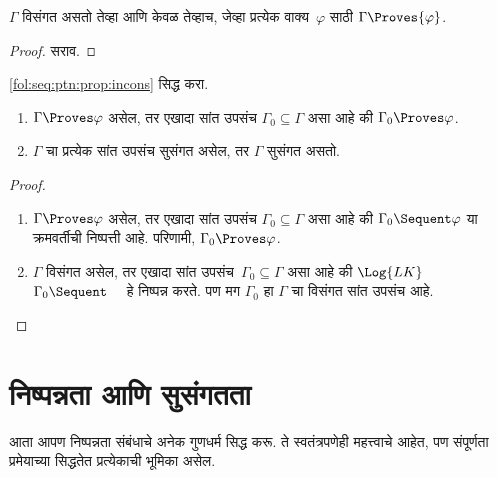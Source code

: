 \begin{prop}
\label{fol:seq:ptn:prop:incons}
$\Gamma$ विसंगत असतो तेव्हा आणि केवळ तेव्हाच, जेव्हा प्रत्येक
  वाक्य~$\varphi$ साठी $\Gamma \Proves {\varphi}$.
\end{prop}

\begin{proof}
सराव.
\end{proof}

\begin{prob}
\ref{fol:seq:ptn:prop:incons} सिद्ध करा.
\end{prob}

\begin{prop}[संहतता]
  \label{fol:seq:ptn:prop:proves-compact}
  \begin{enumerate}
  \item $\Gamma \Proves \varphi$ असेल, तर एखादा सांत उपसंच $\Gamma_0
    \subseteq \Gamma$ असा आहे की $\Gamma_0 \Proves \varphi$.
  \item $\Gamma$ चा प्रत्येक सांत उपसंच सुसंगत असेल, तर $\Gamma$ सुसंगत
    असतो.
  \end{enumerate}
\end{prop}

\begin{proof}
  \begin{enumerate}
    \item $\Gamma \Proves \varphi$ असेल, तर एखादा सांत उपसंच
      $\Gamma_0 \subseteq \Gamma$ असा आहे की $\Gamma_0
      \Sequent \varphi$ या क्रमवर्तीची निष्पत्ती आहे. परिणामी,
      $\Gamma_0 \Proves \varphi$.
    \item $\Gamma$ विसंगत असेल, तर एखादा सांत
      उपसंच~$\Gamma_0 \subseteq \Gamma$ असा आहे की $\Log{LK}$
      $\Gamma_0 \Sequent \quad$ हे निष्पन्न करते. पण मग $\Gamma_0$ हा
      $\Gamma$ चा विसंगत सांत उपसंच आहे.
  \end{enumerate}
\end{proof}









\section{निष्पन्नता आणि सुसंगतता}\label{fol:seq:prv:sec}

आता आपण निष्पन्नता संबंधाचे अनेक गुणधर्म सिद्ध करू. ते स्वतंत्रपणेही
महत्त्वाचे आहेत, पण संपूर्णता प्रमेयाच्या सिद्धतेत प्रत्येकाची भूमिका असेल.


